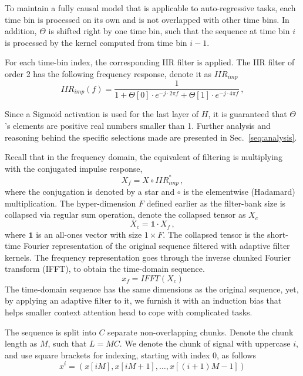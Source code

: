 \documentclass[11pt]{article}
\begin{document}
 To maintain a fully causal model that is applicable to auto-regressive tasks, each time bin is processed on its own and is not overlapped with other time bins.
In addition,  $\Theta$ is shifted right by one time bin, such that the sequence at time bin $i$ is processed by the kernel computed from time bin $i-1$.

For each time-bin index, the corresponding IIR filter is applied. 
The IIR  filter of order 2 has the following frequency response, denote it as $IIR_{imp}$ 
\begin{equation}
    IIR_{imp}(f) = \frac{1}{1 + \Theta[0]\cdot e^{-j\cdot2\pi f} + \Theta[1]\cdot e^{-j\cdot4\pi f}}\,,
\end{equation}

Since a Sigmoid activation is used for the last layer of $H$, it is guaranteed that $\Theta$'s elements are positive real numbers smaller than 1. 
Further analysis and reasoning behind the specific selections made are presented in Sec.~\ref{seq:analysis}.

Recall that in the frequency domain, the equivalent of filtering is multiplying with the conjugated impulse response,
\begin{equation}
    X_f = X\circ IIR_{imp}^*\,,
\end{equation}
where the conjugation is denoted by a star and $\circ$ is the elementwise (Hadamard) multiplication.
The hyper-dimension $F$ defined earlier as the filter-bank size is collapsed via regular sum operation, denote the collapsed tensor as $X_c$
\begin{equation}
    X_c = \mathbf{1} \cdot X_f\,,
\end{equation}
where $\mathbf{1}$ is an all-ones vector with size $1\times F$.
The collapsed tensor is the short-time Fourier representation of the original sequence filtered with adaptive filter kernels. The frequency representation goes through the inverse chunked Fourier transform (IFFT), to obtain the time-domain sequence.
\begin{equation}
    x_f = IFFT(X_c)
\end{equation}
The time-domain sequence has the same dimensions as the original sequence, yet, by applying an adaptive filter to it, we furnish it with an induction bias that helps smaller context attention head to cope with complicated tasks.

The sequence is split into $C$ separate non-overlapping chunks. Denote the chunk length as $M$, such that $L=MC$.
We denote the chunk of signal with uppercase $i$, and use square brackets for indexing, starting with index 0, as follows
\begin{equation}
    x^i = (x[iM],x[iM+1],\dots,x[(i+1)M-1])
    \label{eq:chunks}
\end{equation}
\end{document}
